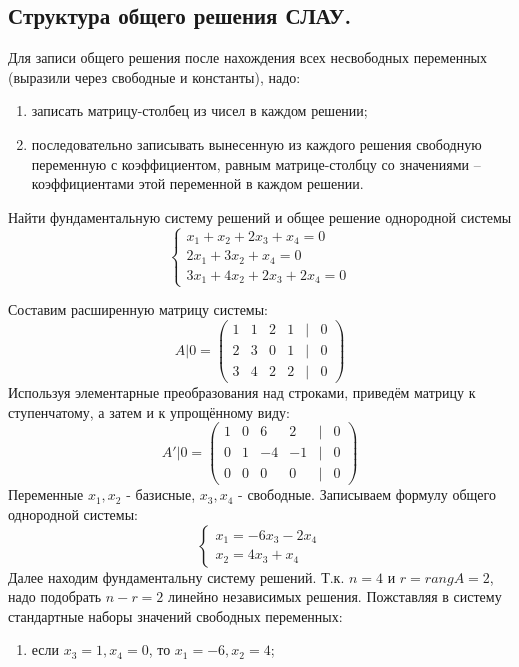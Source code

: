 \documentclass[a4paper,14pt]{article}
\begin{document}
\subsection{Структура общего решения СЛАУ.}
Для записи общего решения после нахождения всех несвободных переменных (выразили через свободные и константы), надо:
\begin{enumerate}
	\item записать матрицу-столбец из чисел в каждом решении;
	\item последовательно записывать вынесенную из каждого решения свободную переменную с коэффициентом, равным матрице-столбцу со значениями – коэффициентами этой переменной в каждом решении.
\end{enumerate}
\begin{exmp}
	Найти фундаментальную систему решений и общее решение однородной системы
	\[
	\begin{cases}
	x_1 + x_2 + 2x_3 + x_4 = 0 \\
	2x_1 + 3x_2 + x_4 = 0 \\
	3x_1 + 4x_2 + 2x_3 + 2x_4 = 0
	\end{cases}
	\]
	\begin{nonum}
		Составим расширенную матрицу системы:
		\[
		A|0 = 
		\begin{pmatrix}
		1 & 1 & 2 & 1 & | & 0 \\
		2 & 3 & 0 & 1 & | & 0 \\
		3 & 4 & 2 & 2 & | & 0
		\end{pmatrix}
		\]
		Используя элементарные преобразования над строками, приведём матрицу к ступенчатому, а затем и к упрощённому виду:
		\[
		A'|0 = 
		\begin{pmatrix}
		1 & 0 & 6 & 2 & | & 0 \\
		0 & 1 & -4 & -1 & | & 0 \\
		0 & 0 & 0 & 0 & | & 0
		\end{pmatrix}
		\]
		Переменные $x_1, x_2$ - базисные, $x_3, x_4$ - свободные. Записываем формулу общего однородной системы:
		\[
		\begin{cases}
		x_1 = -6x_3 - 2x_4 \\
		x_2 = 4x_3 + x_4
		\end{cases}
		\]
		Далее находим фундаментальну систему решений. Т.к. $n=4$ и $r = rang A = 2$, надо подобрать $n - r = 2$ линейно независимых решения. Пожставляя в систему стандартные наборы значений свободных переменных:
		\begin{enumerate}
			\item если $x_3 = 1, x_4 = 0$, то $x_1 = -6, x_2 = 4$;

\end{enumerate}
\end{nonum}
\end{exmp}
\end{document}
